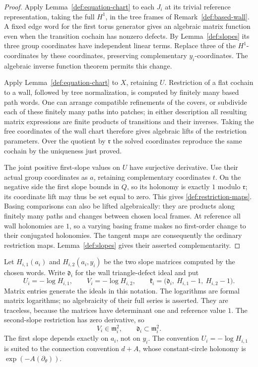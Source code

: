 \begin{proof}
Apply Lemma~\ref{def:equation-chart} to each \(J_i\) at its trivial
reference representation, taking the full \(H^1\), in the tree
frames of Remark~\ref{def:based-wall}.  A fixed edge word for the
first torus generator gives an algebraic matrix function even
when the transition cochain has nonzero defects.  By
Lemma~\ref{def:slopes} its three group coordinates have independent
linear terms.  Replace three of the \(H^1\)-coordinates by these
coordinates, preserving complementary \(y_i\)-coordinates.
The algebraic inverse function theorem permits this change.

Apply Lemma~\ref{def:equation-chart} to \(X\), retaining \(U\).
Restriction of a flat cochain to a wall, followed by tree
normalization, is computed by finitely many based path words.
One can arrange compatible refinements of the covers, or
subdivide each of these finitely many paths into patches; in
either description all resulting matrix expressions are finite
products of transitions and their inverses.  Taking the free
coordinates of the wall chart therefore gives algebraic lifts of
the restriction parameters.  Over the quotient by \(\mathfrak r\)
the solved coordinates reproduce the same cochain by the
uniqueness just proved.

The joint positive first-slope values on \(U\) have surjective
derivative.  Use their actual group coordinates as \(a\), retaining
complementary coordinates \(t\).  On the negative side the first
slope bounds in \(Q\), so its holonomy is exactly \(1\) modulo
\(\mathfrak r\); its coordinate lift may thus be set equal to
zero.  This gives \eqref{def:restriction-maps}.  Basing comparisons
can also be lifted algebraically: they are products along finitely
many paths and changes between chosen local frames.  At reference
all wall holonomies are \(1\), so a varying basing frame makes
no first-order change to their conjugated holonomies.  The
tangent maps are consequently the ordinary restriction maps.
Lemma~\ref{def:slopes} gives their asserted complementarity.
\end{proof}

Let \(H_{i,1}(a_i)\) and \(H_{i,2}(a_i,y_i)\) be the two slope
matrices computed by the chosen words.  Write \(\mathfrak d_i\)
for the wall triangle-defect ideal and put
\begin{equation}
 U_i=-\log H_{i,1},\qquad V_i=-\log H_{i,2},\qquad
 \mathfrak k_i=
  \bigl(\mathfrak d_i,\ H_{i,1}-1,\ H_{i,2}-1\bigr).
 \label{def:wall-ideal}
\end{equation}
Matrix entries generate the ideals in this notation.
The logarithms are formal matrix logarithms; no algebraicity
of their full series is asserted.  They are traceless, because
the matrices have determinant one and reference value \(1\).
The second-slope restriction has zero derivative, so
\[
 V_i\in\mathfrak m_i^2,\qquad \mathfrak d_i\subset\mathfrak m_i^2.
\]
The first slope depends exactly on \(a_i\), not on \(y_i\).
The convention \(U_i=-\log H_{i,1}\) is suited to the connection
convention \(d+A\), whose constant-circle holonomy is
\(\exp(-A(\partial_\theta))\).

